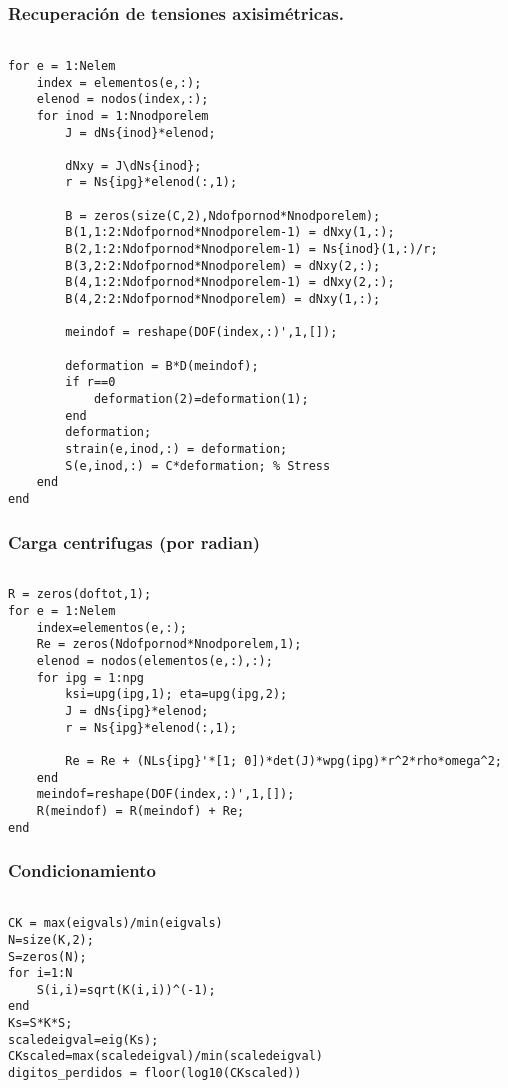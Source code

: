 \subsubsection*{Recuperación de tensiones axisimétricas.}
\begin{code}
\begin{verbatim}
 
for e = 1:Nelem
    index = elementos(e,:);
    elenod = nodos(index,:);
    for inod = 1:Nnodporelem
        J = dNs{inod}*elenod;                  

        dNxy = J\dNs{inod};     
        r = Ns{ipg}*elenod(:,1);
        
        B = zeros(size(C,2),Ndofpornod*Nnodporelem);
        B(1,1:2:Ndofpornod*Nnodporelem-1) = dNxy(1,:);
        B(2,1:2:Ndofpornod*Nnodporelem-1) = Ns{inod}(1,:)/r;
        B(3,2:2:Ndofpornod*Nnodporelem) = dNxy(2,:);
        B(4,1:2:Ndofpornod*Nnodporelem-1) = dNxy(2,:);
        B(4,2:2:Ndofpornod*Nnodporelem) = dNxy(1,:);
        
        meindof = reshape(DOF(index,:)',1,[]);
        
        deformation = B*D(meindof);
        if r==0
            deformation(2)=deformation(1);
        end
        deformation;
        strain(e,inod,:) = deformation;
        S(e,inod,:) = C*deformation; % Stress
    end
end
\end{verbatim}
\end{code}
\subsubsection*{Carga centrifugas (por radian)}
\begin{code}
\begin{verbatim}

R = zeros(doftot,1);
for e = 1:Nelem
    index=elementos(e,:);
    Re = zeros(Ndofpornod*Nnodporelem,1);
    elenod = nodos(elementos(e,:),:);
    for ipg = 1:npg
        ksi=upg(ipg,1); eta=upg(ipg,2);
        J = dNs{ipg}*elenod;
        r = Ns{ipg}*elenod(:,1);
        
        Re = Re + (NLs{ipg}'*[1; 0])*det(J)*wpg(ipg)*r^2*rho*omega^2;
    end
    meindof=reshape(DOF(index,:)',1,[]);
    R(meindof) = R(meindof) + Re;
end
\end{verbatim}
\end{code}

\subsubsection*{Condicionamiento}
\begin{code}
\begin{verbatim}

CK = max(eigvals)/min(eigvals)
N=size(K,2);
S=zeros(N);
for i=1:N
    S(i,i)=sqrt(K(i,i))^(-1);
end
Ks=S*K*S;
scaledeigval=eig(Ks);
CKscaled=max(scaledeigval)/min(scaledeigval)
digitos_perdidos = floor(log10(CKscaled))
\end{verbatim}
\end{code}

